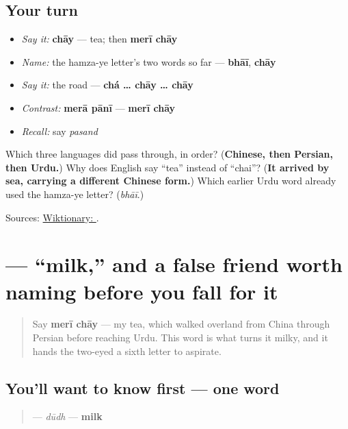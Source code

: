 \subsection*{Your turn}
\begin{itemize}
\raggedright
  \item \emph{Say it:} \textbf{chāy} — tea; then \textbf{merī chāy}
  \item \emph{Name:} the hamza-ye letter's two words so far — \textbf{bhāī}, \textbf{chāy}
  \item \emph{Say it:} the road — \textbf{chá … chāy … chāy}
  \item \emph{Contrast:} \textbf{merā pānī} — \textbf{merī chāy}
  \item \emph{Recall:} say \emph{pasand}
\end{itemize}

\begin{tcolorbox}[breakable,colback=teal!4,colframe=teal!35!black,title={Before you move on}]
Which three languages did \textbf{} pass through, in order? (\textbf{Chinese, then Persian, then Urdu.}) Why does English say \textquotedblleft{}tea\textquotedblright{} instead of \textquotedblleft{}chai\textquotedblright{}? (\textbf{It arrived by sea, carrying a different Chinese form.}) Which earlier Urdu word already used the hamza-ye letter? (\emph{bhāī}.)

Sources: \href{https://en.wiktionary.org/wiki/\%DA\%86\%D8\%A7\%D8\%A6\%DB\%92}{Wiktionary: }.
\end{tcolorbox}
\section[\texorpdfstring{\ur{دودھ} (dūdh)}{دودھ (dūdh)}]{ — \textquotedblleft{}milk,\textquotedblright{} and a false friend worth naming before you fall for it}

\label{lesson:UR-C12-doodh}



\begin{quote}
Say \textbf{merī chāy} — my tea, which walked overland from China through Persian before reaching Urdu. This word is what turns it milky, and it hands the two-eyed \textbf{} a sixth letter to aspirate.
\end{quote}

\subsection*{You'll want to know first — one word}
\begin{quote}
\textbf{} — \emph{dūdh} — \textbf{milk}
\end{quote}

